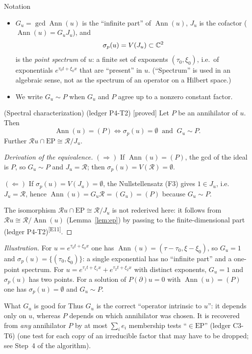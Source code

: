 \documentclass[11pt,a4paper]{article}
\theoremstyle{definition}
\newcommand{\badge}[2]{\textcolor{#1}{\textsf{\footnotesize[#2]}}}
\newcommand{\proved}[1][]{\badge{cC}{proved#1}}
\newcommand{\led}[1]{\textcolor{cG}{\textsf{\footnotesize(ledger #1)}}}
\newcommand{\edmark}[1]{\textsuperscript{\textcolor{cB}{\textsf{[#1]}}}}
\newcommand{\Ann}{\operatorname{Ann}}
\newcommand{\EP}{\mathrm{EP}}
\newcommand{\ring}{\mathcal{R}}
\newcommand{\Var}{V}
\DeclareMathOperator{\Gcd}{gcd}
\begin{document}
\begin{notebox}{Notation}
\begin{itemize}[nosep]
\item $G_u=\Gcd\Ann(u)$ is the ``infinite part'' of $\Ann(u)$, $J_u$ is the cofactor ($\Ann(u)=G_uJ_u$), and
\[
\sigma_p(u)=\Var(J_u)\subset\C^2
\]
is the \emph{point spectrum} of $u$: a finite set of exponents $(\tau_0,\xi_0)$, i.e.\ of exponentials $e^{\tau_0t+\xi_0x}$ that are ``present'' in $u$. (``Spectrum'' is used in an algebraic sense, not as the spectrum of an operator on a Hilbert space.)
\item We write $G_u\sim P$ when $G_u$ and $P$ agree up to a nonzero constant factor.
\end{itemize}
\end{notebox}
\begin{proposition}{(Spectral characterization) \led{P4-T2} \proved[]}\label{prop:spec}
Let $P$ be an annihilator of $u$. Then
\[
\Ann(u)=(P)\iff \sigma_p(u)=\emptyset\ \text{ and }\ G_u\sim P .
\]
Further $\ring u\cap\EP\cong\ring/J_u$.
\end{proposition}
\begin{proof}[Derivation of the equivalence]
$(\Rightarrow)$ If $\Ann(u)=(P)$, the gcd of the ideal is $P$, so $G_u\sim P$ and $J_u=\ring$; then $\sigma_p(u)=\Var(\ring)=\emptyset$.

$(\Leftarrow)$ If $\sigma_p(u)=\Var(J_u)=\emptyset$, the Nullstellensatz (F3) gives $1\in J_u$, i.e.\ $J_u=\ring$, hence $\Ann(u)=G_u\ring=(G_u)=(P)$ because $G_u\sim P$.

The isomorphism $\ring u\cap\EP\cong\ring/J_u$ is not rederived here: it follows from $\ring u\cong\ring/\Ann(u)$ (Lemma~\ref{lem:ep}) by passing to the finite-dimensional part (ledger P4-T2)\edmark{E11}.
\end{proof}
\emph{Illustration.} For $u=e^{\tau_0t+\xi_0x}$ one has $\Ann(u)=(\tau-\tau_0,\xi-\xi_0)$, so $G_u=1$ and $\sigma_p(u)=\{(\tau_0,\xi_0)\}$: a single exponential has no ``infinite part'' and a one-point spectrum. For $u=e^{\tau_1t+\xi_1x}+e^{\tau_2t+\xi_2x}$ with distinct exponents, $G_u=1$ and $\sigma_p(u)$ has two points. For a solution of $P(\partial)u=0$ with $\Ann(u)=(P)$ one has $\sigma_p(u)=\emptyset$ and $G_u\sim P$.

\begin{aside}{What $G_u$ is good for}
Thus $G_u$ is the correct ``operator intrinsic to $u$'': it depends only on $u$, whereas $P$ depends on which annihilator was chosen. It is recovered from \emph{any} annihilator $P$ by at most $\sum_ie_i$ membership tests ``$\in\EP$'' \led{C3-T6} (one test for each copy of an irreducible factor that may have to be dropped; see Step~4 of the algorithm).
\end{aside}
\end{document}
